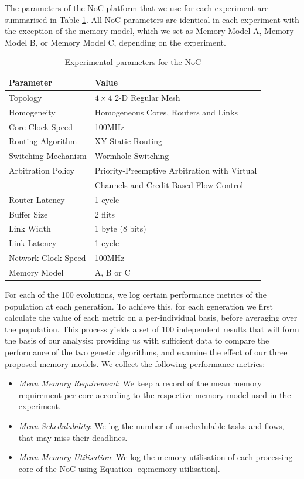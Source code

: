 \documentclass[10pt,conference]{IEEEtran}
\begin{document}
The parameters of the NoC platform that we use for each experiment are summarised in Table \ref{tab:noc-config}. All NoC parameters are identical in each experiment with the exception of the memory model, which we set as Memory Model A, Memory Model B, or Memory Model C, depending on the experiment.

\vspace{-1ex}
\begin{table}[ht!]
  \label{tab:noc-config}
  \centering
  \caption{Experimental parameters for the NoC}
  \footnotesize
  \begin{tabularx}{0.48\textwidth}{lX}
    \toprule
    Parameter & Value \\
    \midrule
    Topology & $4\times4$ 2-D Regular Mesh \\
    Homogeneity & Homogeneous Cores, Routers and Links \\
    Core Clock Speed & 100MHz \\
    Routing Algorithm & XY Static Routing \\
    Switching Mechanism & Wormhole Switching \\
    Arbitration Policy & Priority-Preemptive Arbitration with Virtual \\ & Channels and Credit-Based Flow Control \\
    Router Latency & 1 cycle \\
    Buffer Size & 2 flits \\
    Link Width & 1 byte (8 bits) \\
    Link Latency & 1 cycle \\
    Network Clock Speed & 100MHz \\
    Memory Model & A, B or C \\
    \bottomrule
  \end{tabularx}
\end{table}

For each of the 100 evolutions, we log certain performance metrics of the population at each generation. To achieve this, for each generation we first calculate the value of each metric on a per-individual basis, before averaging over the population. This process yields a set of 100 independent results that will form the basis of our analysis: providing us with sufficient data to compare the performance of the two genetic algorithms, and examine the effect of our three proposed memory models. We collect the following performance metrics:

\begin{itemize}
  \item\emph{Mean Memory Requirement}: We keep a record of the mean memory requirement per core according to the respective memory model used in the experiment.
  \item\emph{Mean Schedulability}: We log the number of unschedulable tasks and flows, that may miss their deadlines.
  \item\emph{Mean Memory Utilisation}: We log the memory utilisation of each processing core of the NoC using Equation \ref{eq:memory-utilisation}.
\end{itemize}
\end{document}
